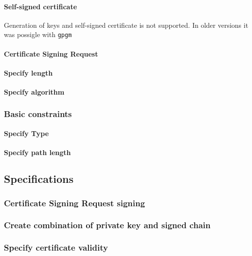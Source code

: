 \documentclass[10pt, a4paper]{report}
\begin{document}
      \paragraph{Self-signed certificate}
Generation of keys and self-signed certificate is not supported. In older versions it was possigle with \verb+gpgm+
      \paragraph{Certificate Signing Request}
      
      \paragraph{Specify length}
      
      \paragraph{Specify algorithm}
      
    \subsubsection{Basic constraints}
    
      \paragraph{Specify Type}
      
      \paragraph{Specify path length}
      
  \subsection{Specifications}
  
    \subsubsection{Certificate Signing Request signing}
    
    \subsubsection{Create combination of private key and signed chain}
    
    \subsubsection{Specify certificate validity}
    
\end{document}
